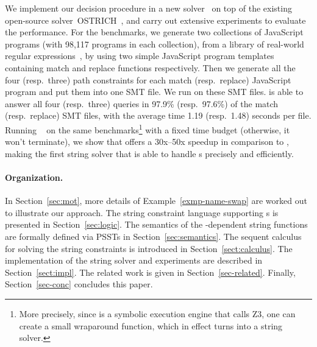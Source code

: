 We implement our decision procedure in a new solver \ostrich\  
on top of the existing open-source solver~OSTRICH~\cite{CHL+19},
and carry out extensive experiments to evaluate the performance. For the benchmarks, we generate two collections of JavaScript programs (with 98,117 programs in each collection), from a library of real-world regular expressions~\cite{DMC+19}, by using two simple JavaScript program templates containing match and replace functions respectively.  
 Then we generate all the four (resp.\ three) path constraints for each match (resp.\ replace) JavaScript program and put them into one SMT file. We run {\ostrich} on these SMT files. {\ostrich} is able to answer all four (resp.\ three) queries in 97.9\% (resp.\ 97.6\%) of the match (resp.\ replace) SMT files, with the average time 1.19 (resp.\ 1.48) seconds per file. 
Running \expose{}~\cite{LMK19} on the same benchmarks\footnote{More precisely, since
\expose{} is a symbolic execution engine that calls Z3, one can create a small 
wraparound function, which in effect turns \expose{} into a string solver.}
with a fixed time budget (otherwise, 
it won't terminate), we show that \ostrich{} offers a 30x--50x speedup in 
comparison to \expose{}, making \ostrich{} the first string solver that
is able to handle \regexp{}s precisely and efficiently.

\paragraph{Organization.} In Section~\ref{sec:mot}, more details of Example~\ref{exmp-name-swap} are worked out to illustrate our approach. The string constraint language supporting {\regexp}s is presented in Section~\ref{sec:logic}. The semantics of the {\regexp}-dependent string functions are formally defined via PSSTs in Section~\ref{sec:semantics}. The sequent calculus for solving the string constraints is introduced in Section~\ref{sect:calculus}. The implementation of the string solver and experiments are described in Section~\ref{sect:impl}. The related work is given in Section~\ref{sec-related}. Finally, Section~\ref{sec-conc} concludes this paper.

